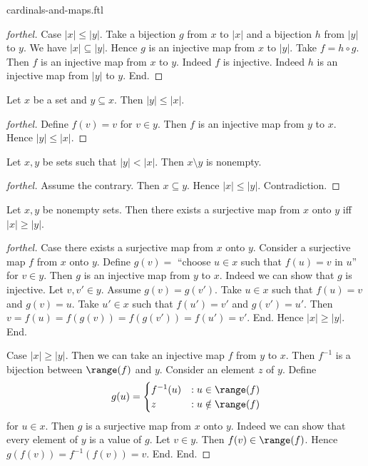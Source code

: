 \documentclass{naproche-library}
\begin{document}
\begin{smodule}[title=Cardinal Numbers and Maps]{cardinals-and-maps.ftl}
\begin{proof}[forthel]
  Case $|x| \leq |y|$.
    Take a bijection $g$ from $x$ to $|x|$ and a bijection $h$ from $|y|$ to $y$.
    We have $|x| \subseteq |y|$.
    Hence $g$ is an injective map from $x$ to $|y|$.
    Take $f = h \circ g$.
    Then $f$ is an injective map from $x$ to $y$.
    Indeed $f$ is injective.
    Indeed $h$ is an injective map from $|y|$ to $y$.
  End.
\end{proof}

\begin{corollary}[forthel,id=SET_THEORY_06_4944303633727488]
  Let $x$ be a set and $y \subseteq x$.
  Then $|y| \leq |x|$.
\end{corollary}
\begin{proof}[forthel]
  Define $f(v) = v$ for $v \in y$.
  Then $f$ is an injective map from $y$ to $x$.
  Hence $|y| \leq |x|$.
\end{proof}

\begin{corollary}[forthel,id=SET_THEORY_06_7746592696172544]
  Let $x, y$ be sets such that $|y| < |x|$.
  Then $x \setminus y$ is nonempty.
\end{corollary}
\begin{proof}[forthel]
  Assume the contrary.
  Then $x \subseteq y$.
  Hence $|x| \leq |y|$.
  Contradiction.
\end{proof}

\begin{proposition}[forthel,id=SET_THEORY_06_192336220913664]
  Let $x, y$ be nonempty sets.
  Then there exists a surjective map from $x$ onto $y$ iff $|x| \geq |y|$.
\end{proposition}
\begin{proof}[forthel]
  Case there exists a surjective map from $x$ onto $y$.
    Consider a surjective map $f$ from $x$ onto $y$.
    Define $g(v) =$ ``choose $u \in x$ such that $f(u) = v$ in $u$'' for $v \in y$.
    Then $g$ is an injective map from $y$ to $x$.
    Indeed we can show that $g$ is injective.
      Let $v, v' \in y$.
      Assume $g(v) = g(v')$.
      Take $u \in x$ such that $f(u) = v$ and $g(v) = u$.
      Take $u' \in x$ such that $f(u') = v'$ and $g(v') = u'$.
      Then $v
        = f(u)
        = f(g(v))
        = f(g(v'))
        = f(u')
        = v'$.
    End.
    Hence $|x| \geq |y|$.
  End.

  Case $|x| \geq |y|$.
    Then we can take an injective map $f$ from $y$ to $x$.
    Then $f^{-1}$ is a bijection between $\range(f)$ and $y$.
    Consider an element $z$ of $y$.
    Define \[ g(u) =
      \begin{cases}
        f^{-1}(u) & : u \in \range(f) \\
        z         & : u \notin \range(f)
      \end{cases} \]
    for $u \in x$.
    Then $g$ is a surjective map from $x$ onto $y$.
    Indeed we can show that every element of $y$ is a value of $g$.
      Let $v \in y$.
      Then $f(v) \in \range(f)$.
      Hence $g(f(v)) = f^{-1}(f(v)) = v$.
    End.
  End.
\end{proof}


\end{smodule}
\end{document}
